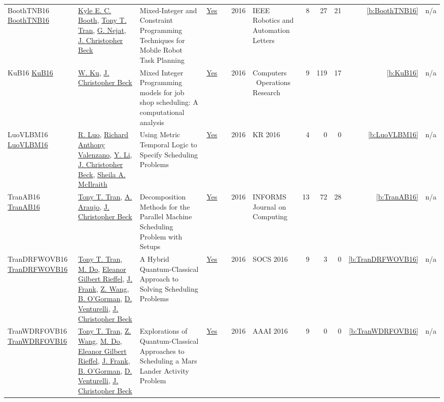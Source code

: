 {\begin{longtable}{>{\raggedright\arraybackslash}p{3cm}>{\raggedright\arraybackslash}p{6cm}>{\raggedright\arraybackslash}p{6.5cm}rrrp{2.5cm}rrrrr}
BoothTNB16 \href{http://dx.doi.org/10.1109/lra.2016.2522096}{BoothTNB16} & \hyperref[auth:a208]{Kyle E. C. Booth}, \hyperref[auth:a805]{Tony T. Tran}, \hyperref[auth:a209]{G. Nejat}, \hyperref[auth:a89]{J. Christopher Beck} & Mixed-Integer and Constraint Programming Techniques for Mobile Robot Task Planning & \href{../works/BoothTNB16.pdf}{Yes} & \cite{BoothTNB16} & 2016 & IEEE Robotics and Automation Letters & 8 & 27 & 21 & \ref{b:BoothTNB16} & n/a\\
KuB16 \href{https://doi.org/10.1016/j.cor.2016.04.006}{KuB16} & \hyperref[auth:a334]{W. Ku}, \hyperref[auth:a89]{J. Christopher Beck} & Mixed Integer Programming models for job shop scheduling: {A} computational analysis & \href{../works/KuB16.pdf}{Yes} & \cite{KuB16} & 2016 & Computers \  Operations Research & 9 & 119 & 17 & \ref{b:KuB16} & n/a\\
LuoVLBM16 \href{http://www.aaai.org/ocs/index.php/KR/KR16/paper/view/12909}{LuoVLBM16} & \hyperref[auth:a819]{R. Luo}, \hyperref[auth:a820]{Richard Anthony Valenzano}, \hyperref[auth:a821]{Y. Li}, \hyperref[auth:a89]{J. Christopher Beck}, \hyperref[auth:a822]{Sheila A. McIlraith} & Using Metric Temporal Logic to Specify Scheduling Problems & \href{../works/LuoVLBM16.pdf}{Yes} & \cite{LuoVLBM16} & 2016 & KR 2016 & 4 & 0 & 0 & \ref{b:LuoVLBM16} & n/a\\
TranAB16 \href{https://doi.org/10.1287/ijoc.2015.0666}{TranAB16} & \hyperref[auth:a805]{Tony T. Tran}, \hyperref[auth:a813]{A. Araujo}, \hyperref[auth:a89]{J. Christopher Beck} & Decomposition Methods for the Parallel Machine Scheduling Problem with Setups & \href{../works/TranAB16.pdf}{Yes} & \cite{TranAB16} & 2016 & INFORMS Journal on Computing & 13 & 72 & 28 & \ref{b:TranAB16} & n/a\\
TranDRFWOVB16 \href{https://doi.org/10.1609/socs.v7i1.18390}{TranDRFWOVB16} & \hyperref[auth:a805]{Tony T. Tran}, \hyperref[auth:a815]{M. Do}, \hyperref[auth:a816]{Eleanor Gilbert Rieffel}, \hyperref[auth:a382]{J. Frank}, \hyperref[auth:a814]{Z. Wang}, \hyperref[auth:a817]{B. O'Gorman}, \hyperref[auth:a818]{D. Venturelli}, \hyperref[auth:a89]{J. Christopher Beck} & A Hybrid Quantum-Classical Approach to Solving Scheduling Problems & \href{../works/TranDRFWOVB16.pdf}{Yes} & \cite{TranDRFWOVB16} & 2016 & SOCS 2016 & 9 & 3 & 0 & \ref{b:TranDRFWOVB16} & n/a\\
TranWDRFOVB16 \href{http://www.aaai.org/ocs/index.php/WS/AAAIW16/paper/view/12664}{TranWDRFOVB16} & \hyperref[auth:a805]{Tony T. Tran}, \hyperref[auth:a814]{Z. Wang}, \hyperref[auth:a815]{M. Do}, \hyperref[auth:a816]{Eleanor Gilbert Rieffel}, \hyperref[auth:a382]{J. Frank}, \hyperref[auth:a817]{B. O'Gorman}, \hyperref[auth:a818]{D. Venturelli}, \hyperref[auth:a89]{J. Christopher Beck} & Explorations of Quantum-Classical Approaches to Scheduling a Mars Lander Activity Problem & \href{../works/TranWDRFOVB16.pdf}{Yes} & \cite{TranWDRFOVB16} & 2016 & AAAI 2016 & 9 & 0 & 0 & \ref{b:TranWDRFOVB16} & n/a\\

\end{longtable}}
